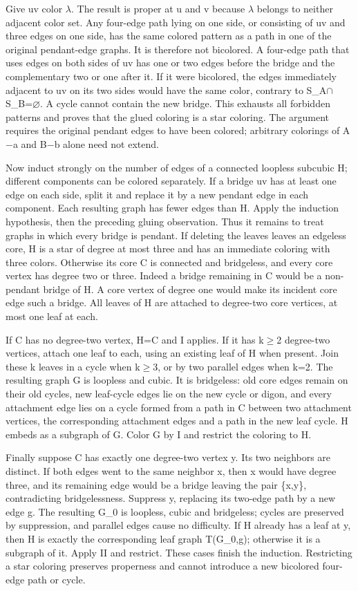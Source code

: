 \documentclass[11pt,a4paper]{article}
\begin{document}
Give uv color \ensuremath{\lambda}. The result is proper at u and v because \ensuremath{\lambda} belongs to neither adjacent color set. Any four-edge path lying on one side, or consisting of uv and three edges on one side, has the same colored pattern as a path in one of the original pendant-edge graphs. It is therefore not bicolored. A four-edge path that uses edges on both sides of uv has one or two edges before the bridge and the complementary two or one after it. If it were bicolored, the edges immediately adjacent to uv on its two sides would have the same color, contrary to S\_A\ensuremath{\cap}S\_B=\ensuremath{\varnothing}. A cycle cannot contain the new bridge. This exhausts all forbidden patterns and proves that the glued coloring is a star coloring. The argument requires the original pendant edges to have been colored; arbitrary colorings of A\ensuremath{-}a and B\ensuremath{-}b alone need not extend.

Now induct strongly on the number of edges of a connected loopless subcubic H; different components can be colored separately. If a bridge uv has at least one edge on each side, split it and replace it by a new pendant edge in each component. Each resulting graph has fewer edges than H. Apply the induction hypothesis, then the preceding gluing observation. Thus it remains to treat graphs in which every bridge is pendant. If deleting the leaves leaves an edgeless core, H is a star of degree at most three and has an immediate coloring with three colors. Otherwise its core C is connected and bridgeless, and every core vertex has degree two or three. Indeed a bridge remaining in C would be a non-pendant bridge of H. A core vertex of degree one would make its incident core edge such a bridge. All leaves of H are attached to degree-two core vertices, at most one leaf at each.

If C has no degree-two vertex, H=C and I applies. If it has k\ensuremath{\geq}2 degree-two vertices, attach one leaf to each, using an existing leaf of H when present. Join these k leaves in a cycle when k\ensuremath{\geq}3, or by two parallel edges when k=2. The resulting graph G is loopless and cubic. It is bridgeless: old core edges remain on their old cycles, new leaf-cycle edges lie on the new cycle or digon, and every attachment edge lies on a cycle formed from a path in C between two attachment vertices, the corresponding attachment edges and a path in the new leaf cycle. H embeds as a subgraph of G. Color G by I and restrict the coloring to H.

Finally suppose C has exactly one degree-two vertex y. Its two neighbors are distinct. If both edges went to the same neighbor x, then x would have degree three, and its remaining edge would be a bridge leaving the pair \{x,y\}, contradicting bridgelessness. Suppress y, replacing its two-edge path by a new edge g. The resulting G\_0 is loopless, cubic and bridgeless; cycles are preserved by suppression, and parallel edges cause no difficulty. If H already has a leaf at y, then H is exactly the corresponding leaf graph T(G\_0,g); otherwise it is a subgraph of it. Apply II and restrict. These cases finish the induction. Restricting a star coloring preserves properness and cannot introduce a new bicolored four-edge path or cycle.
\end{document}
